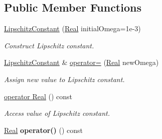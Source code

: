 \subsection*{Public Member Functions}
\begin{DoxyCompactItemize}
\item 
\hyperlink{classSpacy_1_1LipschitzConstant_aa260cc7420e3f5cfc7fe2d78fb2aa7ad_aa260cc7420e3f5cfc7fe2d78fb2aa7ad}{Lipschitz\+Constant} (\hyperlink{classSpacy_1_1Real}{Real} initial\+Omega=1e-\/3)
\begin{DoxyCompactList}\small\item\em Construct Lipschitz constant. \end{DoxyCompactList}\item 
\hyperlink{classSpacy_1_1LipschitzConstant}{Lipschitz\+Constant} \& \hyperlink{classSpacy_1_1LipschitzConstant_a7f5636d01898427c65555da9b55450dd_a7f5636d01898427c65555da9b55450dd}{operator=} (\hyperlink{classSpacy_1_1Real}{Real} new\+Omega)
\begin{DoxyCompactList}\small\item\em Assign new value to Lipschitz constant. \end{DoxyCompactList}\item 
\hyperlink{classSpacy_1_1LipschitzConstant_ab62af4397f997ca46374f89f06463a71_ab62af4397f997ca46374f89f06463a71}{operator Real} () const 
\begin{DoxyCompactList}\small\item\em Access value of Lipschitz constant. \end{DoxyCompactList}\item 
\hypertarget{classSpacy_1_1LipschitzConstant_a440e8652f1b67cbcff2ea57a05e7e7b5}{}\hyperlink{classSpacy_1_1Real}{Real} {\bfseries operator()} () const \label{classSpacy_1_1LipschitzConstant_a440e8652f1b67cbcff2ea57a05e7e7b5}


\end{DoxyCompactItemize}

